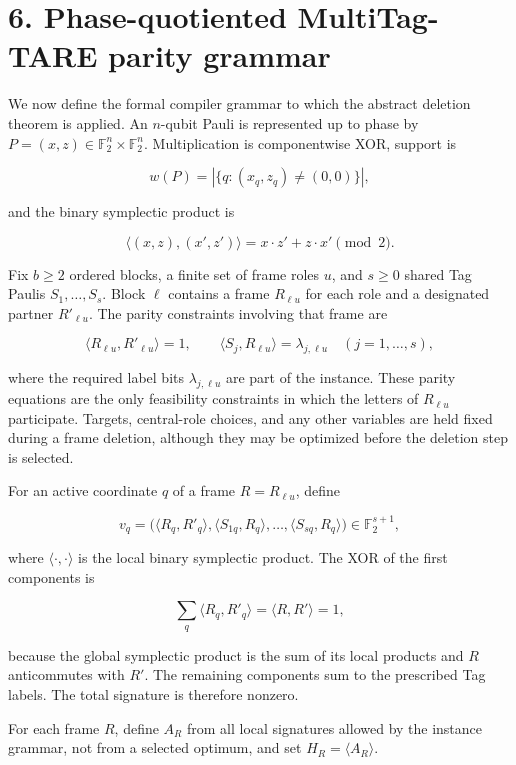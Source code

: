 \documentclass[11pt]{article}
\begin{document}
\section*{6. Phase-quotiented MultiTag-TARE parity grammar}\label{phase-quotiented-multitag-tare-parity-grammar}

We now define the formal compiler grammar to which the abstract deletion theorem is applied. An \(n\)-qubit Pauli is represented up to phase by \(P=(x,z)\in\mathbb{F}_2^n\times\mathbb{F}_2^n\). Multiplication is componentwise XOR, support is

\[
w(P)=|\{q:(x_q,z_q)\neq(0,0)\}|,
\]

and the binary symplectic product is

\[
\langle (x,z),(x',z')\rangle=x\cdot z'+z\cdot x'\pmod 2.
\]

Fix \(b\geq2\) ordered blocks, a finite set of frame roles \(u\), and \(s\geq0\) shared Tag Paulis \(S_1,\ldots,S_s\). Block \(\ell\) contains a frame \(R_{\ell u}\) for each role and a designated partner \(R'_{\ell u}\). The parity constraints involving that frame are

\[
\langle R_{\ell u},R'_{\ell u}\rangle=1,
\qquad
\langle S_j,R_{\ell u}\rangle=\lambda_{j,\ell u}
\quad (j=1,\ldots,s),
\]

where the required label bits \(\lambda_{j,\ell u}\) are part of the instance. These parity equations are the only feasibility constraints in which the letters of \(R_{\ell u}\) participate. Targets, central-role choices, and any other variables are held fixed during a frame deletion, although they may be optimized before the deletion step is selected.

For an active coordinate \(q\) of a frame \(R=R_{\ell u}\), define

\[
v_q=
\bigl(
\langle R_q,R'_q\rangle,
\langle S_{1q},R_q\rangle,
\ldots,
\langle S_{sq},R_q\rangle
\bigr)
\in \mathbb{F}_2^{s+1},
\]

where \(\langle\cdot,\cdot\rangle\) is the local binary symplectic product. The XOR of the first components is

\[
\sum_q \langle R_q,R'_q\rangle
=
\langle R,R'\rangle
=1,
\]

because the global symplectic product is the sum of its local products and \(R\) anticommutes with \(R'\). The remaining components sum to the prescribed Tag labels. The total signature is therefore nonzero.

For each frame \(R\), define \(A_R\) from all local signatures allowed by the instance grammar, not from a selected optimum, and set \(H_R=\langle A_R\rangle\).
\end{document}
